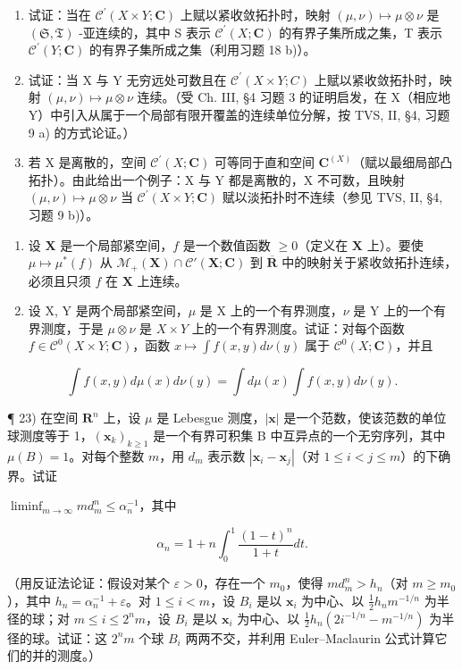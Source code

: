 \begin{enumerate}
\def\labelenumi{\alph{enumi})}
\item
  试证：当在 \(\mathcal{C}^{\prime}(X\times Y;\mathbf{C})\) 上赋以紧收敛拓扑时，映射 \((\mu,\nu)\mapsto\mu\otimes\nu\) 是 \((\mathfrak{S},\mathfrak{T})\) -亚连续的，其中 S 表示 \(\mathcal{C}^{\prime}(X;\mathbf{C})\) 的有界子集所成之集，T 表示 \(\mathcal{C}^{\prime}(Y;\mathbf{C})\) 的有界子集所成之集（利用习题 18 b)）。
\item
  试证：当 X 与 Y 无穷远处可数且在 \(\mathcal{C}^{\prime}(X\times Y;C)\) 上赋以紧收敛拓扑时，映射 \((\mu,\nu)\mapsto\mu\otimes\nu\) 连续。（受 Ch. III, §4 习题 3 的证明启发，在 X（相应地 Y）中引入从属于一个局部有限开覆盖的连续单位分解，按 TVS, II, §4, 习题 9 a) 的方式论证。）
\item
  若 X 是离散的，空间 \(\mathcal{C}^{\prime}(X;\mathbf{C})\) 可等同于直和空间 \(\mathbf{C}^{(X)}\)（赋以最细局部凸拓扑）。由此给出一个例子：X 与 Y 都是离散的，X 不可数，且映射 \((\mu,\nu)\mapsto\mu\otimes\nu\) 当 \(\mathcal{C}^{\prime}(X\times Y;\mathbf{C})\) 赋以淡拓扑时不连续（参见 TVS, II, §4, 习题 9 b)）。
\end{enumerate}

\begin{enumerate}
\def\labelenumi{\arabic{enumi})}
\setcounter{enumi}{20}
\item
  设 \(\mathbf{X}\) 是一个局部紧空间，\(f\) 是一个数值函数 \(\geqslant 0\)（定义在 \(\mathbf{X}\) 上）。要使 \(\mu \mapsto \mu^{*}(f)\) 从 \(\mathcal{M}_{+}(\mathbf{X}) \cap \mathcal{C}'(\mathbf{X};\mathbf{C})\) 到 \(\overline{\mathbf{R}}\) 中的映射关于紧收敛拓扑连续，必须且只须 \(f\) 在 \(\mathbf{X}\) 上连续。
\item
  设 X, Y 是两个局部紧空间，\(\mu\) 是 X 上的一个有界测度，\(\nu\) 是 Y 上的一个有界测度，于是 \(\mu \otimes \nu\) 是 \(X \times Y\) 上的一个有界测度。试证：对每个函数 \(f \in \mathcal{C}^{0}(X \times Y; \mathbf{C})\)，函数 \(x \mapsto \int f(x, y) d\nu(y)\) 属于 \(\mathcal{C}^{0}(X; \mathbf{C})\)，并且
\end{enumerate}

\[
\int f (x, y) d \mu (x) d \nu (y) = \int d \mu (x) \int f (x, y) d \nu (y).
\]

¶ 23) 在空间 \(\mathbf{R}^n\) 上，设 \(\mu\) 是 Lebesgue 测度，\(|\mathbf{x}|\) 是一个范数，使该范数的单位球测度等于 1，\((\mathbf{x}_k)_{k \geqslant 1}\) 是一个有界可积集 B 中互异点的一个无穷序列，其中 \(\mu(B) = 1\)。对每个整数 \(m\)，用 \(d_m\) 表示数 \(|\mathbf{x}_i - \mathbf{x}_j|\)（对 \(1 \leqslant i < j \leqslant m\)）的下确界。试证

\(\liminf_{m \to \infty} md_m^n \leqslant \alpha_n^{-1}\)，其中

\[
\alpha_ {n} = 1 + n \int_ {0} ^ {1} \frac {(1 - t) ^ {n}}{1 + t} d t.
\]

（用反证法论证：假设对某个 \(\varepsilon > 0\)，存在一个 \(m_0\)，使得 \(md_m^n > h_n\)（对 \(m \geqslant m_0\)），其中 \(h_n = \alpha_n^{-1} + \varepsilon\)。对 \(1 \leqslant i < m\)，设 \(B_i\) 是以 \(\mathbf{x}_i\) 为中心、以 \(\frac{1}{2} h_n m^{-1/n}\) 为半径的球；对 \(m \leqslant i \leqslant 2^n m\)，设 \(B_i\) 是以 \(\mathbf{x}_i\) 为中心、以 \(\frac{1}{2} h_n (2i^{-1/n} - m^{-1/n})\) 为半径的球。试证：这 \(2^n m\) 个球 \(B_i\) 两两不交，并利用 Euler--Maclaurin 公式计算它们的并的测度。）

